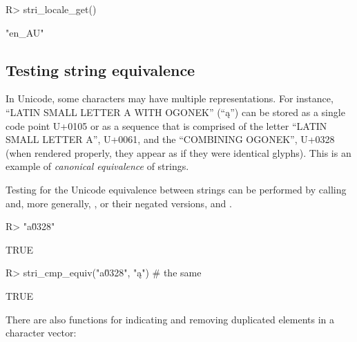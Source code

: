 \documentclass[nojss]{jss}
\begin{document}
\begin{Schunk}
\begin{Sinput}
R> stri_locale_get()
\end{Sinput}
\begin{Soutput}
[1] "en_AU"
\end{Soutput}
\end{Schunk}


%
%
%
%
%







\subsection{Testing string equivalence}\label{Sec:Equivalence}



In Unicode, some characters may have multiple representations.
For instance, ``LATIN SMALL LETTER A WITH OGONEK'' (``ą'') can be stored
as a single code point U+0105 or as a sequence
that is comprised of the letter ``LATIN SMALL LETTER A'', U+0061, and
the ``{COMBINING OGONEK}'', U+0328 (when rendered properly, they appear
as if they were identical glyphs).
This is an example of \textit{canonical equivalence} of strings.

Testing for the Unicode equivalence between strings
can be performed by calling  and, more generally,
, or their negated versions,
 and .

\begin{Schunk}
\begin{Sinput}
R> "a\u0328" %s==% "ą"             # a, ogonek == a with ogonek
\end{Sinput}
\begin{Soutput}
[1] TRUE
\end{Soutput}
\begin{Sinput}
R> stri_cmp_equiv("a\u0328", "ą")  # the same
\end{Sinput}
\begin{Soutput}
[1] TRUE
\end{Soutput}
\end{Schunk}



There are also functions for indicating and removing
duplicated elements in a character vector:
\end{document}
